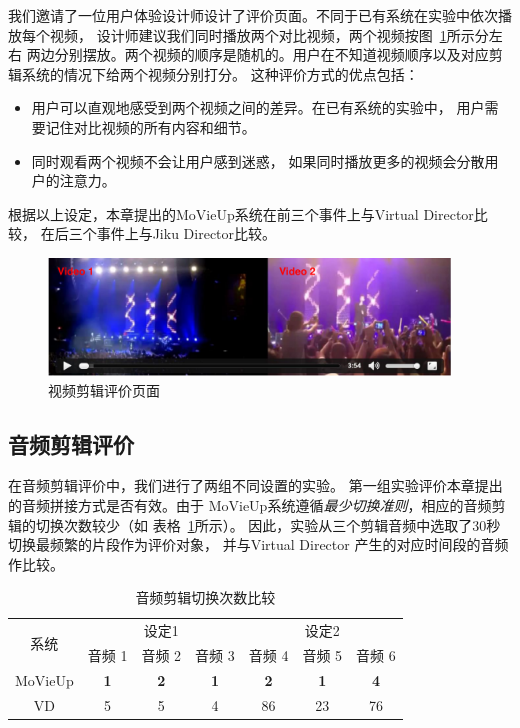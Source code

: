 \documentclass[doctor]{ustcthesis}
\begin{document}
我们邀请了一位用户体验设计师设计了评价页面。不同于已有系统在实验中依次播放每个视频，
设计师建议我们同时播放两个对比视频，两个视频按图~\ref{fig:mashup-eval-interface}所示分左右
两边分别摆放。两个视频的顺序是随机的。用户在不知道视频顺序以及对应剪辑系统的情况下给两个视频分别打分。
这种评价方式的优点包括：
\vspace{-0.3em}
\begin{itemize}\setlength{\itemsep}{-0.3em}
    \item 用户可以直观地感受到两个视频之间的差异。在已有系统的实验中，
        用户需要记住对比视频的所有内容和细节。
    \item 同时观看两个视频不会让用户感到迷惑，
        如果同时播放更多的视频会分散用户的注意力。
\end{itemize}
根据以上设定，本章提出的MoVieUp系统在前三个事件上与Virtual Director比较，
在后三个事件上与Jiku Director比较。
\begin{figure}[t]
    \centering
    \includegraphics[clip=true, width=0.95\textwidth]{mashup-eval-interface.pdf}
    \caption{视频剪辑评价页面}
    \label{fig:mashup-eval-interface}
\end{figure}

\subsection{音频剪辑评价}
在音频剪辑评价中，我们进行了两组不同设置的实验。
第一组实验评价本章提出的音频拼接方式是否有效。由于
MoVieUp系统遵循\emph{最少切换准则}，相应的音频剪辑的切换次数较少（如
表格~\ref{tab:mashup-audio-switch-times}所示）。
因此，实验从三个剪辑音频中选取了30秒切换最频繁的片段作为评价对象，
并与Virtual Director 产生的对应时间段的音频作比较。
\begin{table}[htpb]
    \centering
    \caption{音频剪辑切换次数比较}
    \label{tab:mashup-audio-switch-times}
    \begin{tabular}{|c|c|c|c|c|c|c|}
        \hline
        \multirow{2}{*}{系统} & \multicolumn{3}{c|}{设定1} &
        \multicolumn{3}{c|}{设定2}\\
        \cline{2-7}
        & 音频 1& 音频 2 & 音频 3 & 音频 4 & 音频 5 & 音频 6 \\
        \hline
        MoVieUp &\textbf{1} &\textbf{2} & \textbf{1} & \textbf{2} & \textbf{1}& \textbf{4} \\
        VD &5 & 5 & 4 & 86 & 23 & 76 \\
        \hline
    \end{tabular}
\end{table}
\end{document}
